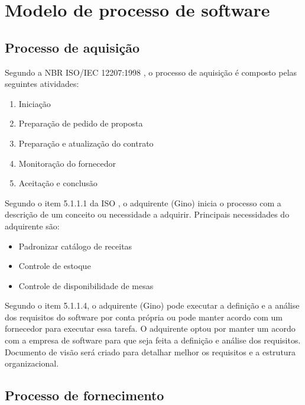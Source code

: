 \chapter{Modelo de processo de software}
\label{cap:modeloprocesso}

\section{Processo de aquisição}
\label{sec:aquisicao}

Segundo a NBR ISO/IEC 12207:1998 \cite{iso12207:95}, o processo de aquisição é composto pelas seguintes atividades:

\begin{enumerate}
  \item Iniciação
  \item Preparação de pedido de proposta
  \item Preparação e atualização do contrato
  \item Monitoração do fornecedor
  \item Aceitação e conclusão
\end{enumerate}

Segundo o item 5.1.1.1 da ISO \cite{iso12207:95}, o adquirente (Gino) inicia o processo com a
descrição de um conceito ou necessidade a adquirir. Principais necessidades do adquirente são:

\begin{itemize}
  \item Padronizar catálogo de receitas
  \item Controle de estoque
  \item Controle de disponibilidade de mesas
\end{itemize}

Segundo o item 5.1.1.4, o adquirente (Gino) pode executar a definição e a análise dos requisitos do software por conta própria ou pode manter acordo com um fornecedor para executar essa tarefa. O adquirente optou por manter um acordo com a empresa de software para que seja feita a definição e análise dos requisitos. Documento de visão será criado para detalhar melhor os requisitos e a estrutura organizacional.



\section{Processo de fornecimento}
\label{sec:fornecimento}

